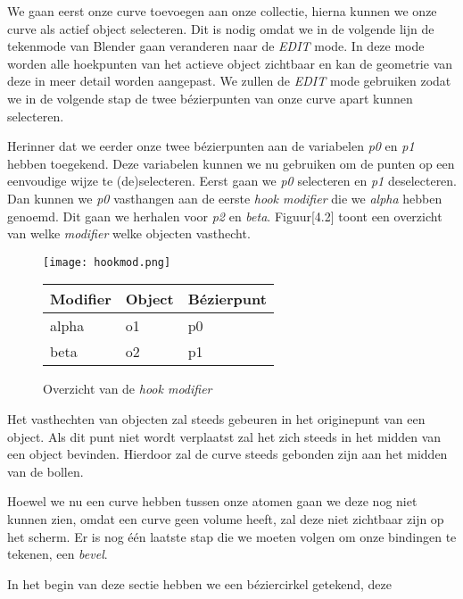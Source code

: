   

We gaan eerst onze curve toevoegen aan onze collectie, hierna kunnen we onze curve als actief object selecteren. Dit is nodig omdat we in de volgende lijn de tekenmode van Blender gaan veranderen naar de \textit{EDIT} mode. In deze mode worden alle hoekpunten van het actieve object zichtbaar en kan de geometrie van deze in meer detail worden aangepast. We zullen de \textit{EDIT} mode gebruiken zodat we in de volgende stap de twee bézierpunten van onze curve apart kunnen selecteren. 



Herinner dat we eerder onze twee bézierpunten aan de variabelen \textit{p0} en \textit{p1} hebben toegekend. Deze variabelen kunnen we nu gebruiken om de punten op een eenvoudige wijze te (de)selecteren. Eerst gaan we \textit{p0} selecteren en \textit{p1} deselecteren. Dan kunnen we \textit{p0} vasthangen aan de eerste \textit{hook modifier} die we \textit{alpha} hebben genoemd. Dit gaan we herhalen voor \textit{p2} en \textit{beta}. Figuur[4.2] toont een overzicht van welke \textit{modifier} welke objecten vasthecht.  

\begin{figure}[h]
\texttt{[image: hookmod.png]}
\begin{tabular}{lll}
\hline
\multicolumn{1}{|l|}{Modifier} & \multicolumn{1}{l|}{Object} & \multicolumn{1}{l|}{Bézierpunt} \\ \hline
alpha                          & o1                          & p0                              \\
beta                           & o2                          & p1                             
\end{tabular}
\caption{Overzicht van de \textit{hook modifier}}
\end{figure}

Het vasthechten van objecten zal steeds gebeuren in het originepunt van een object. Als dit punt niet wordt verplaatst zal het zich steeds in het midden van een object bevinden. Hierdoor zal de curve steeds gebonden zijn aan het midden van de bollen.
\par
Hoewel we nu een curve hebben tussen onze atomen gaan we deze nog niet kunnen zien, omdat een curve geen volume heeft, zal deze niet zichtbaar zijn op het scherm. Er is nog één laatste stap die we moeten volgen om onze bindingen te tekenen, een \textit{bevel}.



In het begin van deze sectie hebben we een béziercirkel getekend, deze    



 





